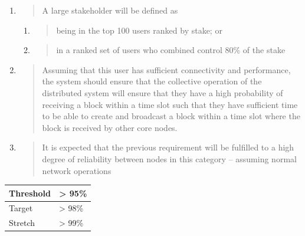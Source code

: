 \documentclass[11pt,a4paper]{article}
\begin{document}
\begin{enumerate}
\def\labelenumi{\arabic{enumi}.}
\item
  \begin{quote}
  A large stakeholder will be defined as
  \end{quote}

  \begin{enumerate}
  \def\labelenumii{\alph{enumii}.}
  \item
    \begin{quote}
    being in the top 100 users ranked by stake; or
    \end{quote}
  \item
    \begin{quote}
    in a ranked set of users who combined control 80\% of the stake
    \end{quote}
  \end{enumerate}
\item
  \begin{quote}
  Assuming that this user has sufficient connectivity and performance,
  the system should ensure that the collective operation of the
  distributed system will ensure that they have a high probability of
  receiving a block within a time slot such that they have sufficient
  time to be able to create and broadcast a block within a time slot
  where the block is received by other core nodes.
  \end{quote}
\item
  \begin{quote}
  It is expected that the previous requirement will be fulfilled to a
  high degree of reliability between nodes in this category -- assuming
  normal network operations
  \end{quote}
\end{enumerate}

\begin{longtable}[]{@{}ll@{}}
\toprule
Threshold & \textgreater{} 95\%\tabularnewline
\midrule
\endhead
Target & \textgreater{} 98\%\tabularnewline
Stretch & \textgreater{} 99\%\tabularnewline
\bottomrule
\end{longtable}
\end{document}
